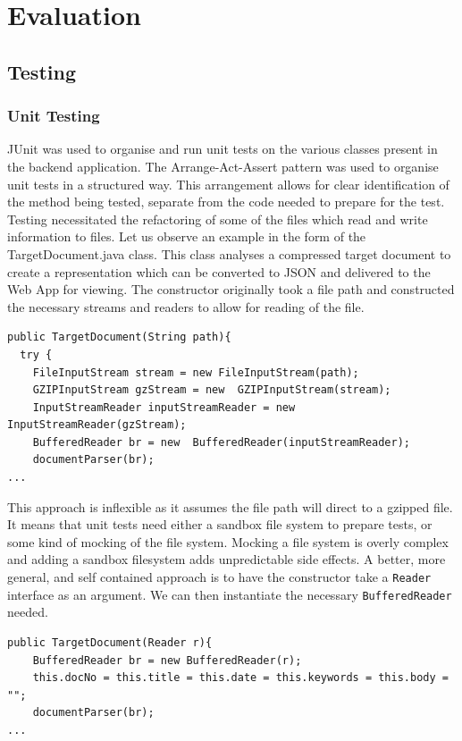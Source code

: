\documentclass{l4proj}
\newcommand{\code}[1]{\texttt{#1}}
\begin{document}
\chapter{Evaluation} \label{evaluation}
\section{Testing}
\subsection{Unit Testing}
JUnit was used to organise and run unit tests on the various classes present in the backend application.
The Arrange-Act-Assert pattern was used to organise unit tests in a structured way. This arrangement allows for clear identification of the method being tested, separate from the code needed to prepare for the test.
Testing necessitated the refactoring of some of the files which read and write information to files. Let us observe an example in the form of the TargetDocument.java class. This class analyses a compressed target document to create a representation which can be converted to JSON and delivered to the Web App for viewing.
The constructor originally took a file path and constructed the necessary streams and readers to allow for reading of the file.
\begin{verbatim}
public TargetDocument(String path){
  try {
    FileInputStream stream = new FileInputStream(path);
    GZIPInputStream gzStream = new  GZIPInputStream(stream);
    InputStreamReader inputStreamReader = new  InputStreamReader(gzStream);
    BufferedReader br = new  BufferedReader(inputStreamReader);
    documentParser(br);
...
\end{verbatim}

This approach is inflexible as it assumes the file path will direct to a gzipped file. It means that unit tests need either a sandbox file system to prepare tests, or some kind of mocking of the file system. Mocking a file system is overly complex and adding a sandbox filesystem adds unpredictable side effects.
A better, more general, and self contained approach is to have the constructor take a \code{Reader} interface as an argument. We can then instantiate the necessary \code{BufferedReader} needed.

\begin{verbatim}
public TargetDocument(Reader r){
    BufferedReader br = new BufferedReader(r);
    this.docNo = this.title = this.date = this.keywords = this.body = "";
    documentParser(br);
...
\end{verbatim}
\end{document}
